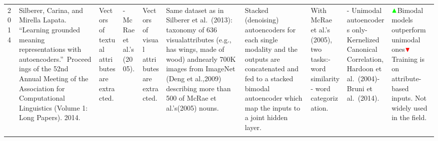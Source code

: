 \documentclass[
]{krantz}
\begin{document}
\begin{longtable}[]{@{}llllllllll@{}}
\begin{minipage}[t]{0.00\columnwidth}
2014\strut
\end{minipage} & \begin{minipage}[t]{0.06\columnwidth}\raggedright
Silberer, Carina, and Mirella Lapata. ``Learning grounded meaning representations with autoencoders.''~Proceedings of the 52nd Annual Meeting of the Association for Computational Linguistics (Volume 1: Long Papers). 2014.\strut
\end{minipage} & \begin{minipage}[t]{0.04\columnwidth}\raggedright
Vectors of textual attributes are extracted.\strut
\end{minipage} & \begin{minipage}[t]{0.02\columnwidth}\raggedright
- McRae et al.'s (2005).\strut
\end{minipage} & \begin{minipage}[t]{0.07\columnwidth}\raggedright
Vectors of visual attributes are extracted.\strut
\end{minipage} & \begin{minipage}[t]{0.05\columnwidth}\raggedright
Same dataset as in Silberer et al.~(2013): taxonomy of 636 visualattributes (e.g., has wings, made of wood) andnearly 700K images from ImageNet (Deng et al.,2009) describing more than 500 of McRae et al.'s(2005) nouns.\strut
\end{minipage} & \begin{minipage}[t]{0.25\columnwidth}\raggedright
Stacked (denoising) autoencoders for each single modality and the outputs are concatenated and fed to a stacked bimodal autoencoder which map the inputs to a joint hidden layer.\strut
\end{minipage} & \begin{minipage}[t]{0.08\columnwidth}\raggedright
With McRae et al.'s (2005), two tasks:- word similarity- word categorization.\strut
\end{minipage} & \begin{minipage}[t]{0.05\columnwidth}\raggedright
- Unimodal autoencoders only- Kernelized Canonical Correlation, Hardoon et al.~(2004)- Bruni et al.~(2014).\strut
\end{minipage} & \begin{minipage}[t]{0.13\columnwidth}\raggedright
\(\color{green}\blacktriangle\)Bimodal models outperform unimodal ones\(\color{red}\blacktriangledown\)Training is on attribute-based inputs. Not widely used in the field.\strut
\end{minipage}\tabularnewline
\begin{minipage}[t]{0.00\columnwidth}\raggedright

\end{minipage}
\end{longtable}
\end{document}
